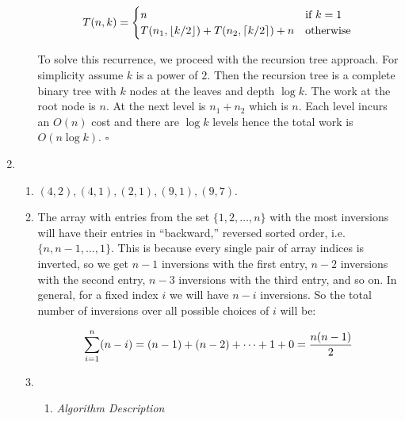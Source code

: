 \documentclass[10pt, letterpaper]{article}
\begin{document}
\begin{enumerate}[label={\bfseries Q\arabic*.}]
\begin{enumerate}
        \[
          T(n, k) = \begin{cases}n & \text{if}\ k = 1 \\ T(n_1, \lfloor k/2 \rfloor) + T(n_2, \lceil k/2 \rceil) + n & \text{otherwise}\end{cases} \\
        \]

        To solve this recurrence, we proceed with the recursion tree approach. For simplicity assume $k$
        is a power of $2$. Then the recursion tree is a complete binary tree with $k$ nodes at the leaves and depth
        $\log k$. The work at the root node is $n$.  At the next level is $n_1 + n_2$ which is $n$. Each level
        incurs an $O(n)$ cost and there are $\log k$ levels hence the total work is $O(n \log k)$. \hfill $\square$
    \end{enumerate}

  \item
    \begin{enumerate}
      \item
        $(4,2), (4,1), (2,1), (9,1), (9,7)$.

      \item
        The array with entries from the set $\{1, 2, \ldots, n\}$ with the most inversions will have their
        entries in ``backward,'' reversed sorted order, i.e. $\{n, n-1, \ldots, 1\}$. This is because every
        single pair of array indices is inverted, so we get $n-1$ inversions with the first entry, $n-2$
        inversions with the second entry, $n-3$ inversions with the third entry, and so on. In general, for
        a fixed index $i$ we will have $n-i$ inversions. So the total number of inversions over all possible
        choices of $i$ will be:

        \[
          \displaystyle\sum_{i=1}^{n} (n-i) = (n-1) + (n-2) + \cdots + 1 + 0 = \dfrac{n(n-1)}{2}
        \]

      \item
        \begin{enumerate}[label={\arabic*.}, leftmargin=*]
          \item
            {\itshape Algorithm Description} \\ \vspace{-3mm}


\end{enumerate}
\end{enumerate}
\end{enumerate}
\end{document}
